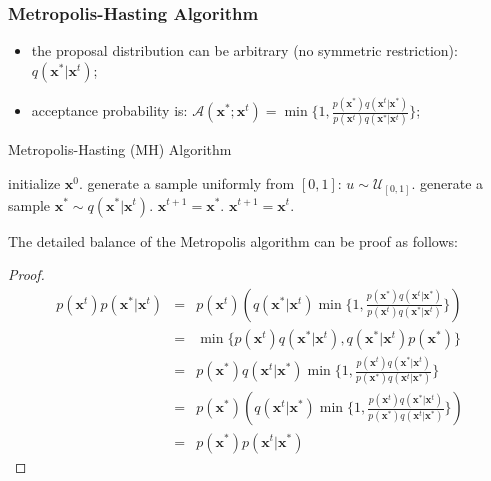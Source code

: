 \subsubsection{Metropolis-Hasting Algorithm} 
\begin{itemize}
	\item the proposal distribution can be arbitrary (no symmetric restriction): $q(\mathbf{x}^*|\mathbf{x}^t)$;
	\item acceptance probability is: $\mathcal{A}(\mathbf{x}^*;\mathbf{x}^t) = \min\{1, \frac{p(\mathbf{x}^*)q(\mathbf{x}^t|\mathbf{x}^*)}{p(\mathbf{x}^t)q(\mathbf{x}^*|\mathbf{x}^t)}\}$; 
\end{itemize}
\begin{algorithm}[t]
	\caption{Metropolis-Hasting (MH) Algorithm}
	\label{alg:LBP}
\begin{algorithmic}[1]
\STATE initialize $\mathbf{x}^0$.
\STATE generate a sample uniformly from $[0,1]$: $u\sim \mathcal{U}_{[0,1]}$.
\STATE generate a sample $\mathbf{x}^*\sim q(\mathbf{x}^*|\mathbf{x}^t)$.
\STATE $\mathbf{x}^{t+1}=\mathbf{x}^*$.
\ELSE 
\STATE $\mathbf{x}^{t+1}=\mathbf{x}^t$.
\ENDIF
\ENDFOR
\end{algorithmic}
\end{algorithm}



The detailed balance of the Metropolis algorithm can be proof as follows:
\begin{proof}
	\begin{equation}
		\begin{array}{rcl}
			p(\mathbf{x}^t)p(\mathbf{x}^*|\mathbf{x}^t)&=&p(\mathbf{x}^t)\left(q(\mathbf{x}^*|\mathbf{x}^t)\min\{1,\frac{p(\mathbf{x}^*)q(\mathbf{x}^t|\mathbf{x}^*)}{p(\mathbf{x}^t)q(\mathbf{x}^*|\mathbf{x}^t)}\}\right) \\
												       &=& \min\{p(\mathbf{x}^t)q(\mathbf{x}^*|\mathbf{x}^t),q(\mathbf{x}^*|\mathbf{x}^t)p(\mathbf{x}^*) \}  \\
			                                           &=& p(\mathbf{x}^*)q(\mathbf{x}^t|\mathbf{x}^*)\min\{1,\frac{p(\mathbf{x}^t)q(\mathbf{x}^*|\mathbf{x}^t)}{p(\mathbf{x}^*)q(\mathbf{x}^t|\mathbf{x}^*)}\} \\
										&=& p(\mathbf{x}^*)\left(q(\mathbf{x}^t|\mathbf{x}^*)\min\{1,\frac{p(\mathbf{x}^t)q(\mathbf{x}^*|\mathbf{x}^t)}{p(\mathbf{x}^*)q(\mathbf{x}^t|\mathbf{x}^*)}\}\right) \\
													   &=& p(\mathbf{x}^*)p(\mathbf{x}^t|\mathbf{x}^*)
	   \end{array}
	\end{equation}
\end{proof}


